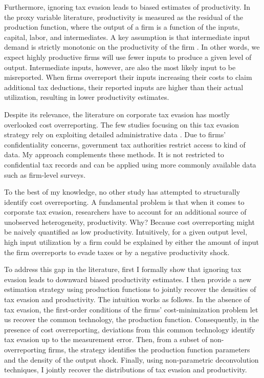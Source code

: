 \documentclass[
  12pt]{article}
\theoremstyle{definition}
\theoremstyle{remark}
\begin{document}
 Furthermore, ignoring
tax evasion leads to biased estimates of productivity. In the proxy
variable literature, productivity is measured as the residual of the
production function, where the output of a firm is a function of the
inputs, capital, labor, and intermediates. A key assumption is that
intermediate input demand is strictly monotonic on the productivity of
the firm \citep{Gandhi2020, Ackerberg2015, Levinsohn2003}. In other
words, we expect highly productive firms will use fewer inputs to
produce a given level of output. Intermediate inputs, however, are also
the most likely input to be misreported. When firms overreport their
inputs increasing their costs to claim additional tax deductions, their
reported inputs are higher than their actual utilization, resulting in
lower productivity estimates.

 Despite its
relevance, the literature on corporate tax evasion has mostly overlooked
cost overreporting. The few studies focusing on this tax evasion
strategy rely on exploiting detailed administrative data
\citep{Zumaya2021, Carrillo2022}. Due to firms' confidentiality
concerns, government tax authorities restrict access to kind of data. My
approach complements these methods. It is not restricted to confidential
tax records and can be applied using more commonly available data such
as firm-level surveys.

 To the best of my knowledge, no other
study has attempted to structurally identify cost overreporting. A
fundamental problem is that when it comes to corporate tax evasion,
researchers have to account for an additional source of unobserved
heterogeneity, productivity. Why? Because cost overreporting might be
naively quantified as low productivity. Intuitively, for a given output
level, high input utilization by a firm could be explained by either the
amount of input the firm overreports to evade taxes or by a negative
productivity shock.

 To address this gap in the literature,
first I formally show that ignoring tax evasion leads to downward biased
productivity estimates. I then provide a new estimation strategy using
production functions to jointly recover the densities of tax evasion and
productivity. The intuition works as follows. In the absence of tax
evasion, the first-order conditions of the firms' cost-minimization
problem let us recover the common technology, the production function.
Consequently, in the presence of cost overreporting, deviations from
this common technology identify tax evasion up to the measurement error.
Then, from a subset of non-overreporting firms, the strategy identifies
the production function parameters and the density of the output shock.
Finally, using non-parametric deconvolution techniques, I jointly
recover the distributions of tax evasion and productivity.
\end{document}
